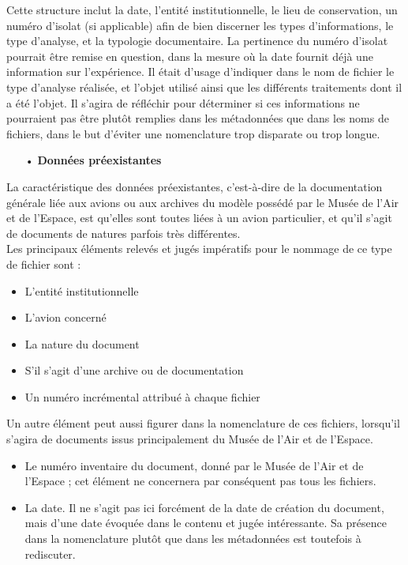 Cette structure inclut la date, l'entité institutionnelle, le lieu de conservation, un numéro d'isolat (si applicable) afin de bien discerner les types d’informations, le type d'analyse, et la typologie documentaire. La pertinence du numéro d'isolat pourrait être remise en question, dans la mesure où la date fournit déjà une information sur l’expérience.
Il était d’usage d’indiquer dans le nom de fichier le type d’analyse réalisée, et l’objet utilisé ainsi que les différents traitements dont il a été l’objet. Il s’agira de réfléchir pour déterminer si ces informations ne pourraient pas être plutôt remplies dans les métadonnées que dans les noms de fichiers, dans le but d’éviter une nomenclature trop disparate ou trop longue.\\

\begin{itemize}
    \item[•] \textbf{Données préexistantes}
\end{itemize}

La caractéristique des données préexistantes, c’est-à-dire de la documentation générale liée aux avions ou aux archives du modèle possédé par le Musée de l’Air et de l’Espace, est qu’elles sont toutes liées à un avion particulier, et qu’il s’agit de documents de natures parfois très différentes.\\

Les principaux éléments relevés et jugés impératifs pour le nommage de ce type de fichier sont :\\

\begin{itemize}
    \item  L’entité institutionnelle
    \item L’avion concerné
    \item La nature du document
    \item S’il s’agit d’une archive ou de documentation
    \item Un numéro incrémental attribué à chaque fichier 
\end{itemize}

Un autre élément peut aussi figurer dans la nomenclature de ces fichiers, lorsqu’il s’agira de documents issus principalement du Musée de l’Air et de l’Espace.\\

\begin{itemize}
    \item Le numéro inventaire du document, donné par le Musée de l’Air et de l’Espace ; cet élément ne concernera par conséquent pas tous les fichiers.
    \item La date. Il ne s’agit pas ici forcément de la date de création du document, mais d’une date évoquée dans le contenu et jugée intéressante. Sa présence dans la nomenclature plutôt que dans les métadonnées est toutefois à rediscuter. 
 \end{itemize}


